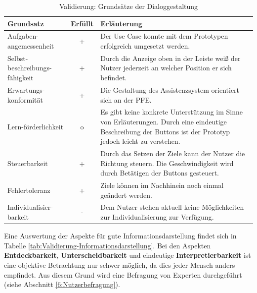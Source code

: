 \begin{table}[htb]
\caption{Validierung: Grundsätze der Dialoggestaltung}
\centering
\begin{tabular}{p{}|c|p{}}
\textbf{Grundsatz} & \textbf{Erfüllt} & \textbf{Erläuterung} \\
\hline
Aufgaben-angemessenheit & + & Der Use Case konnte mit dem Prototypen erfolgreich umgesetzt werden. \\
\hline
Selbst-beschreibungs-fähigkeit & + & Durch die Anzeige oben in der Leiste weiß der Nutzer jederzeit an welcher Position er sich befindet. \\
\hline
Erwartungs-konformität & + & Die Gestaltung des Assistenzsystem orientiert sich an der PFE.\\
\hline
Lern-förderlichkeit & o & Es gibt keine konkrete Unterstützung im Sinne von Erläuterungen. Durch eine eindeutige Beschreibung der Buttons ist der Prototyp jedoch leicht zu verstehen. \\
\hline
Steuerbarkeit & + & Durch das Setzen der Ziele kann der Nutzer die Richtung steuern. Die Geschwindigkeit wird durch Betätigen der Buttons gesteuert. \\
\hline
Fehlertoleranz & + & Ziele können im Nachhinein noch einmal geändert werden. \\
\hline
Individualisier-barkeit & - & Dem Nutzer stehen aktuell keine Möglichkeiten zur Individualisierung zur Verfügung. \\
\end{tabular}
\label{tab:Validierung-Dialoggestaltung}
\end{table}

Eine Auswertung der Aspekte für gute Informationsdarstellung findet sich in Tabelle \ref{tab:Validierung-Informationsdarstellung}. Bei den Aspekten \textbf{Entdeckbarkeit}, \textbf{Unterscheidbarkeit} und eindeutige \textbf{Interpretierbarkeit} ist eine objektive Betrachtung nur schwer möglich, da dies jeder Mensch anders empfindet. Aus diesem Grund wird eine Befragung von Experten durchgeführt (siehe Abschnitt \ref{6:Nutzerbefragung}).

